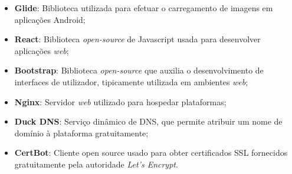 \begin{itemize}
	\item \textbf{Glide}: Biblioteca utilizada para efetuar o carregamento de imagens em aplicações Android;
	\item \textbf{React}: Biblioteca \textit{open-source} de Javascript usada para desenvolver aplicações \textit{web};
	\item \textbf{Bootstrap}: Biblioteca \textit{open-source} que auxilia o desenvolvimento de interfaces de utilizador, tipicamente utilizada em ambientes \textit{web};
	\item \textbf{Nginx}: Servidor \textit{web} utilizado para hospedar plataformas;
	\item \textbf{Duck DNS}: Serviço dinâmico de DNS, que permite atribuir um nome de domínio à plataforma gratuitamente;
	\item \textbf{CertBot}: Cliente open source usado para obter certificados SSL fornecidos gratuitamente pela autoridade \textit{Let's Encrypt}.
\end{itemize}